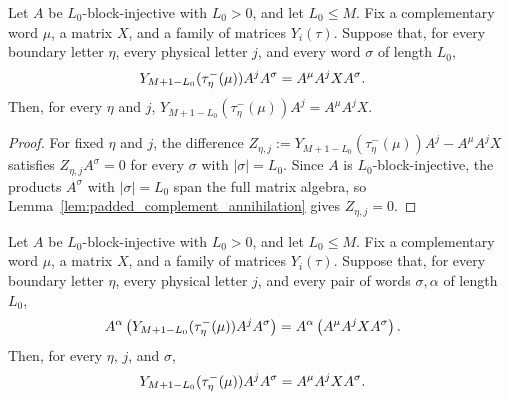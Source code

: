 \begin{lemma}
    \label{lem:closure_property_opposite_boundary_comparison_from_right_words}
    \leanok
    Let $A$ be $L_0$-block-injective with $L_0>0$, and let $L_0\le M$.
    Fix a complementary word $\mu$, a matrix $X$, and a family of matrices
    $Y_i(\tau)$. Suppose that, for every boundary letter $\eta$, every
    physical letter $j$, and every word $\sigma$ of length $L_0$,
    \begin{align}
        Y_{M+1-L_0}(\tau^-_\eta(\mu))A^jA^\sigma
         & =
        A^\mu A^jXA^\sigma.
        \notag
    \end{align}
    Then, for every $\eta$ and $j$,
    $Y_{M+1-L_0}(\tau^-_\eta(\mu))A^j = A^\mu A^jX$.
\end{lemma}

\begin{proof}
    \leanok
    For fixed $\eta$ and $j$, the difference
    $Z_{\eta,j} := Y_{M+1-L_0}(\tau^-_\eta(\mu))A^j-A^\mu A^jX$ satisfies
    $Z_{\eta,j}A^\sigma=0$ for every $\sigma$ with $|\sigma|=L_0$. Since $A$
    is $L_0$-block-injective, the products $A^\sigma$ with $|\sigma|=L_0$ span
    the full matrix algebra, so
    Lemma~\ref{lem:padded_complement_annihilation} gives $Z_{\eta,j}=0$.
\end{proof}

\begin{lemma}
    \label{lem:closure_property_opposite_boundary_comparison_from_left_words}
    \leanok
    Let $A$ be $L_0$-block-injective with $L_0>0$, and let $L_0\le M$.
    Fix a complementary word $\mu$, a matrix $X$, and a family of matrices
    $Y_i(\tau)$. Suppose that, for every boundary letter $\eta$, every physical
    letter $j$, and every pair of words $\sigma,\alpha$ of length $L_0$,
    \begin{align}
        A^\alpha
        \left(Y_{M+1-L_0}(\tau^-_\eta(\mu))A^jA^\sigma\right)
         & =
        A^\alpha\left(A^\mu A^jXA^\sigma\right).
        \notag
    \end{align}
    Then, for every $\eta$, $j$, and $\sigma$,
    \begin{align}
        Y_{M+1-L_0}(\tau^-_\eta(\mu))A^jA^\sigma
         & =
        A^\mu A^jXA^\sigma.
        \notag
    \end{align}
\end{lemma}


